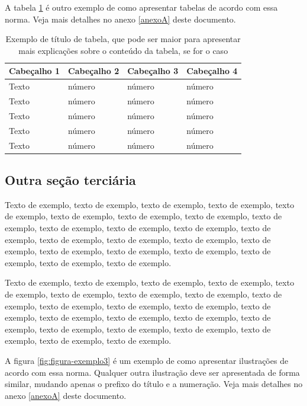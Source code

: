 \documentclass[
	12pt,				%
	oneside,			%
	a4paper,			%
	english,			%
	brazil				%
	]{abntex2ppgsi}
\begin{document}
A tabela \ref{tab:ExemploDeTabela2} é outro exemplo de como apresentar tabelas de acordo com essa norma. Veja mais detalhes no anexo \ref{anexoA} deste documento.

\begin{table}[htbp]
	\centering
	\caption{Exemplo de título de tabela, que pode ser maior para apresentar mais explicações sobre o conteúdo da tabela, se for o caso}
		\begin{tabular}{p{1.2in} p{1.2in} p{1.2in} p{1.2in} } \hline
		
		Cabeçalho 1	& Cabeçalho 2	& Cabeçalho 3	& Cabeçalho 4 \\ \hline
		Texto	& número & número	& número \\ 
		Texto	& número & número	& número \\ 
		Texto	& número & número	& número \\ 
		Texto	& número & número	& número \\ 
		Texto	& número & número	& número \\ \hline
			
		\end{tabular}
	\label{tab:ExemploDeTabela2}
\end{table}

\subsection{Outra seção terciária}

Texto de exemplo, texto de exemplo, texto de exemplo, texto de exemplo, texto de exemplo, texto de exemplo, texto de exemplo, texto de exemplo, texto de exemplo, texto de exemplo, texto de exemplo, texto de exemplo, texto de exemplo, texto de exemplo, texto de exemplo, texto de exemplo, texto de exemplo, texto de exemplo, texto de exemplo, texto de exemplo, texto de exemplo, texto de exemplo, texto de exemplo.

Texto de exemplo, texto de exemplo, texto de exemplo, texto de exemplo, texto de exemplo, texto de exemplo, texto de exemplo, texto de exemplo, texto de exemplo, texto de exemplo, texto de exemplo, texto de exemplo, texto de exemplo, texto de exemplo, texto de exemplo, texto de exemplo, texto de exemplo, texto de exemplo, texto de exemplo, texto de exemplo, texto de exemplo, texto de exemplo, texto de exemplo.

A figura \ref{fig:figura-exemplo3} é um exemplo de como apresentar ilustrações de acordo com essa norma. Qualquer outra ilustração deve ser apresentada de forma similar, mudando apenas o prefixo do título e a numeração. Veja mais detalhes no anexo \ref{anexoA} deste documento.
\end{document}
